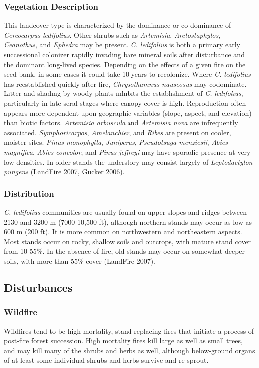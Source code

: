 \subsubsection*{Vegetation Description}
This landcover type is characterized by the dominance or co-dominance of \emph{Cercocarpus ledifolius}. Other shrubs such as \emph{Artemisia}, \emph{Arctostaphylos}, \emph{Ceanothus}, and \emph{Ephedra} may be present. \emph{C. ledifolius} is both a primary early successional colonizer rapidly invading bare mineral soils after disturbance and the dominant long-lived species. Depending on the effects of a given fire on the seed bank, in some cases it could take 10 years to recolonize. Where \emph{C. ledifolius} has reestablished quickly after fire, \emph{Chrysothamnus nauseosus} may codominate. Litter and shading by woody plants inhibits the establishment of \emph{C. ledifolius}, particularly in late seral stages where canopy cover is high. Reproduction often appears more dependent upon geographic variables (slope, aspect, and elevation) than biotic factors. \emph{Artemisia arbuscula} and \emph{Artemisia nova} are infrequently associated. \emph{Symphoricarpos}, \emph{Amelanchier}, and \emph{Ribes} are present on cooler, moister sites. \emph{Pinus monophylla}, \emph{Juniperus}, \emph{Pseudotsuga menziesii}, \emph{Abies magnifica}, \emph{Abies concolor}, and \emph{Pinus jeffreyi} may have sporadic presence at very low densities. In older stands the understory may consist largely of \emph{Leptodactylon pungens} (LandFire 2007, Gucker 2006).

\subsubsection*{Distribution}
\emph{C. ledifolius} communities are usually found on upper slopes and ridges between 2130 and 3200 m (7000-10,500 ft), although northern stands may occur as low as 600 m (200 ft). It is more common on northwestern and northeastern aspects. Most stands occur on rocky, shallow soils and outcrops, with mature stand cover from 10-55\%. In the absence of fire, old stands may occur on somewhat deeper soils, with more than 55\% cover (LandFire 2007).

\subsection*{Disturbances}

\subsubsection*{Wildfire}
Wildfires tend to be high mortality, stand-replacing fires that initiate a process of post-fire forest succession. High mortality fires kill large as well as small trees, and may kill many of the shrubs and herbs as well, although below-ground organs of at least some individual shrubs and herbs survive and re-sprout. 

